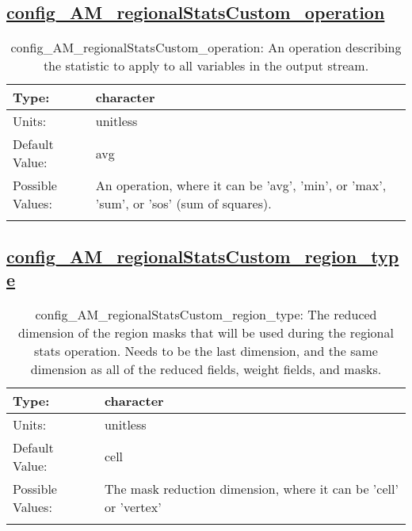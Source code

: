 \subsection[config\_AM\_regionalStatsCustom\_operation]{\hyperref[sec:nm_tab_AM_regionalStatsCustom]{config\_AM\_regionalStatsCustom\_operation}}
\label{subsec:nm_sec_config_AM_regionalStatsCustom_operation}
\begin{center}
\begin{longtable}{| p{2.0in} || p{4.0in} |}
    \hline
    Type: & character \\
    \hline
    Units: & \si{unitless} \\
    \hline
    Default Value: & avg \\
    \hline
    Possible Values: & An operation, where it can be 'avg', 'min', or 'max', 'sum', or 'sos' (sum of squares). \\
    \hline
    \caption{config\_AM\_regionalStatsCustom\_operation: An operation describing the statistic to apply to all variables in the output stream.}
\end{longtable}
\end{center}
\subsection[config\_AM\_regionalStatsCustom\_region\_type]{\hyperref[sec:nm_tab_AM_regionalStatsCustom]{config\_AM\_regionalStatsCustom\_region\_type}}
\label{subsec:nm_sec_config_AM_regionalStatsCustom_region_type}
\begin{center}
\begin{longtable}{| p{2.0in} || p{4.0in} |}
    \hline
    Type: & character \\
    \hline
    Units: & \si{unitless} \\
    \hline
    Default Value: & cell \\
    \hline
    Possible Values: & The mask reduction dimension, where it can be 'cell' or 'vertex' \\
    \hline
    \caption{config\_AM\_regionalStatsCustom\_region\_type: The reduced dimension of the region masks that will be used during the regional stats operation. Needs to be the last dimension, and the same dimension as all of the reduced fields, weight fields, and masks.}
\end{longtable}
\end{center}
